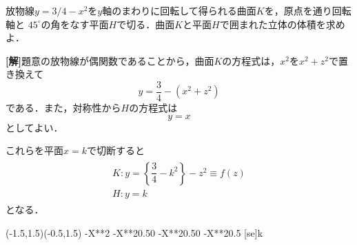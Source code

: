 \documentclass[a4j]{jarticle}
\begin{document}

\begin{oframed}
放物線$y=3/4-x^2$を$y$軸のまわりに回転して得られる曲面$K$を，原点を通り回転軸と
$45^\circ$の角をなす平面$H$で切る．曲面$K$と平面$H$で囲まれた立体の体積を求めよ．
\end{oframed}

\setlength{\columnseprule}{0.4pt}
\begin{multicols}{2}
{\bf[解]}題意の放物線が偶関数であることから，曲面$K$の方程式は，$x^2$を$x^2+z^2$で置き換えて
     \[y=\frac{3}{4}-(x^2+z^2) \]
である．また，対称性から$H$の方程式は
     \[y=x \]
としてよい．

これらを平面$x=k$で切断すると
     \begin{align*}
          \begin{array}{l}
          K:y=\left\{ \dfrac{3}{4}-k^2\right\}-z^2\equiv f(z)\\
          H:y=k
          \end{array}
     \end{align*}
となる．

     \begin{zahyou}[ul=10mm](-1.5,1.5)(-0.5,1.5)
     \def\Fx{1-X**2}
     \def\Gx{0.5}
     \YGurafu*\Fx
     \YGurafu*\Gx
     \YKouten\Fx\Gx{}{0}\tempi\A
     \YKouten\Fx\Gx{0}{}\tempii\B
     \YNurii*\Fx\Gx{\tempi}{\tempii}
     \Put\A[syaei=x,xlabel=-\a]{}
     \Put\B[syaei=x,xlabel=\a]{}
     [se]{k}
     \end{zahyou}


\end{multicols}
\end{document}
